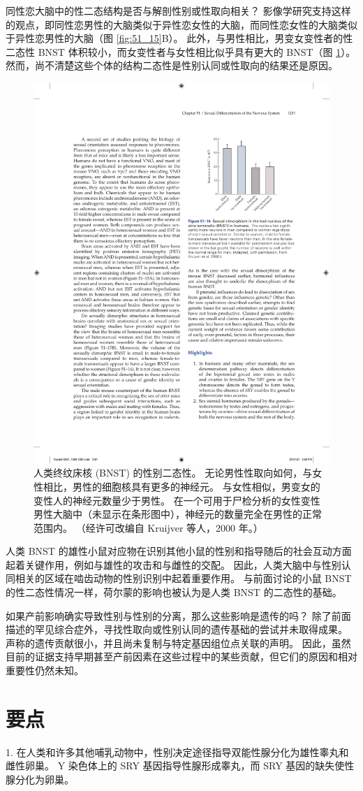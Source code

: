 同性恋大脑中的性二态结构是否与解剖性别或性取向相关？ 影像学研究支持这样的观点，即同性恋男性的大脑类似于异性恋女性的大脑，而同性恋女性的大脑类似于异性恋男性的大脑（图 \ref{fig:51_15}B）。 此外，与男性相比，男变女变性者的性二态性 BNST 体积较小，而女变性者与女性相比似乎具有更大的 BNST（图 \ref{fig:51_16}）。 然而，尚不清楚这些个体的结构二态性是性别认同或性取向的结果还是原因。

\begin{figure}[htbp]
	\centering
	\includegraphics[width=0.4\linewidth]{chap51/fig_51_16}
	\caption{人类终纹床核 (BNST) 的性别二态性。 无论男性性取向如何，与女性相比，男性的细胞核具有更多的神经元。 与女性相似，男变女的变性人的神经元数量少于男性。 在一个可用于尸检分析的女性变性男性大脑中（未显示在条形图中），神经元的数量完全在男性的正常范围内。 （经许可改编自 Kruijver 等人，2000 年。）}
	\label{fig:51_16}
\end{figure}

人类 BNST 的雄性小鼠对应物在识别其他小鼠的性别和指导随后的社会互动方面起着关键作用，例如与雄性的攻击和与雌性的交配。 因此，人类大脑中与性别认同相关的区域在啮齿动物的性别识别中起着重要作用。 与前面讨论的小鼠 BNST 的性二态性情况一样，荷尔蒙的影响也被认为是人类 BNST 的二态性的基础。

如果产前影响确实导致性别与性别的分离，那么这些影响是遗传的吗？ 除了前面描述的罕见综合症外，寻找性取向或性别认同的遗传基础的尝试并未取得成果。 声称的遗传贡献很小，并且尚未复制与特定基因组位点关联的声明。 因此，虽然目前的证据支持早期甚至产前因素在这些过程中的某些贡献，但它们的原因和相对重要性仍然未知。

\section{要点}
1. 在人类和许多其他哺乳动物中，性别决定途径指导双能性腺分化为雄性睾丸和雌性卵巢。 Y 染色体上的 SRY 基因指导性腺形成睾丸，而 SRY 基因的缺失使性腺分化为卵巢。 

